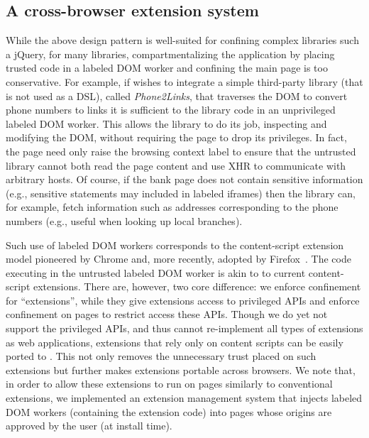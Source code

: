 \subsection{A cross-browser extension system}
\label{sec:system:extension}

While the above design pattern is well-suited for confining complex libraries
such a jQuery, for many libraries, compartmentalizing the application by
placing trusted code in a labeled DOM worker and confining the main page is too
conservative.
%
For example, if  wishes to integrate a simple third-party
library (that is not used as a DSL), called \emph{Phone2Links}, that traverses
the DOM to convert phone numbers to links it is sufficient to the library code
in an unprivileged labeled DOM worker.
%
This allows the library to do its job, inspecting and modifying the DOM,
without requiring the page to drop its privileges.
%
In fact, the page need only raise the browsing context label to ensure that the
untrusted library cannot both read the page content and use XHR to communicate
with arbitrary hosts.
%
Of course, if the bank page does not contain sensitive information (e.g.,
sensitive statements may included in labeled iframes) then the library can, for
example, fetch information such as addresses corresponding to the phone
numbers (e.g., useful when looking up local branches).

Such use of labeled DOM workers corresponds to the content-script extension
model pioneered by Chrome and, more recently, adopted by
Firefox~\cite{Carlini:2012}.
%
The code executing in the untrusted labeled DOM worker is akin to
to current content-script extensions.
%
There are, however, two core difference: we enforce confinement for
``extensions'', while they give extensions access to privileged APIs
and enforce confinement on pages to restrict access these APIs.
%
Though we do yet not support the privileged APIs, and thus cannot re-implement
all types of extensions as web applications, extensions that rely only on
content scripts can be easily ported to \sys{}.
%
This not only removes the unnecessary trust placed on such extensions but further
makes extensions portable across browsers.
%
We note that, in order to allow these extensions to run on pages similarly to
conventional extensions, we implemented an extension management system that
injects labeled DOM workers (containing the extension code) into pages whose
origins are approved by the user (at install time).

